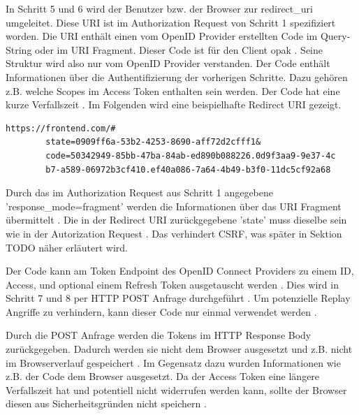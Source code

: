 In Schritt 5 und 6 wird der Benutzer bzw. der Browser zur redirect\_uri umgeleitet. Diese URI ist im Authorization Request von Schritt 1 spezifiziert worden. Die URI enthält einen vom OpenID Provider erstellten Code im Query-String oder im URI Fragment. Dieser Code ist für den Client opak \cite{EB67}. Seine Struktur wird also nur vom OpenID Provider verstanden. Der Code enthält Informationen über die Authentifizierung der vorherigen Schritte. Dazu gehören z.B. welche Scopes im Access Token enthalten sein werden. Der Code hat eine kurze Verfallszeit \cite{EB21}. Im Folgenden wird eine beispielhafte Redirect URI gezeigt.

\begin{lstlisting}[caption=Beispiel Redirect URI, captionpos=b, label=EBBeispielRedirectURI]
https://frontend.com/#
        state=0909ff6a-53b2-4253-8690-aff72d2cfff1&
        code=50342949-85bb-47ba-84ab-ed890b088226.0d9f3aa9-9e37-4c
        b7-a589-06972b3cf410.ef40a086-7a64-4b49-b3f0-11dc5cf92a68
\end{lstlisting}

Durch das im Authorization Request aus Schritt 1 angegebene 'response\_mode=fragment' werden die Informationen über das URI Fragment übermittelt \cite{EB64}. Die in der Redirect URI zurückgegebene 'state' muss dieselbe sein wie in der Autorization Request \cite{EB20}. Das verhindert CSRF, was später in Sektion TODO näher erläutert wird.


Der Code kann am Token Endpoint des OpenID Connect Providers zu einem ID, Access, und optional einem Refresh Token ausgetauscht werden \cite{EB19}. Dies wird in Schritt 7 und 8 per HTTP POST Anfrage durchgeführt \cite{EB20}. Um potenzielle Replay Angriffe zu verhindern, kann dieser Code nur einmal verwendet werden \cite{EB21}.

Durch die POST Anfrage werden die Tokens im HTTP Response Body zurückgegeben. Dadurch werden sie nicht dem Browser ausgesetzt \cite{EB22} und z.B. nicht im Browserverlauf gespeichert \cite{EB23}. Im Gegensatz dazu wurden Informationen wie z.B. der Code dem Browser ausgesetzt. Da der Access Token eine längere Verfallszeit hat und potentiell nicht widerrufen werden kann, sollte der Browser diesen aus Sicherheitsgründen nicht speichern \cite{EB23}.

